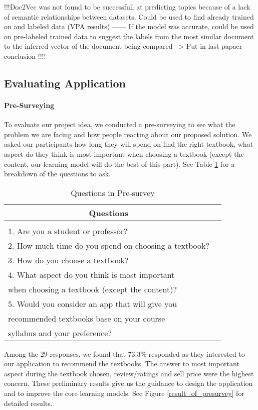 !!!Doc2Vec was not found to be successfull at predicting topics because of a lack of semantic relationships between datasets. Could be used to find already trained on and labeled data (VPA results) ------ If the model was accurate, could be used on pre-labeled trained data to suggest the labels from the most similar document to the inferred vector of the document being compared  --> Put in last papaer conclusion !!!!

\subsection{Evaluating Application}
\paragraph{Pre-Surveying}
To evaluate our project idea, we conducted a pre-surveying to see what the problem we are facing and how people reacting about our proposed solution. We asked our participants how long they will spend on find the right textbook, what aspect do they think is most important when choosing a textbook (except the content, our learning model will do the best of this part). See Table \ref{Pre-survey} for a breakdown of the questions to ask.

\begin{table}[ht] 
\caption{Questions in Pre-survey}
\label{Pre-survey}
\begin{center}
\begin{tabular}{ll}
\multicolumn{1}{c}{\bf Questions} 
\\ \hline \\
1. Are you a student or professor?\\
2. How much time do you spend on choosing a textbook?\\
3. How do you choose a textbook?\\
4. What aspect do you think is most important\\
when choosing a textbook (except the content)? \\
5. Would you consider an app that will give you \\
recommended textbooks base on your course \\
syllabus and your preference? \\
\end{tabular}
\end{center}
\end{table}
Among the 29 responses, we found that 73.3\% responded as they interested to our application to recommend the textbooks. The answer to most important aspect during the textbook chosen, review/ratings and sell price were the highest concern. These preliminary results give us the guidance to design the application and to improve the core learning models. See Figure \ref{result_of_presurvey} for detailed results.


